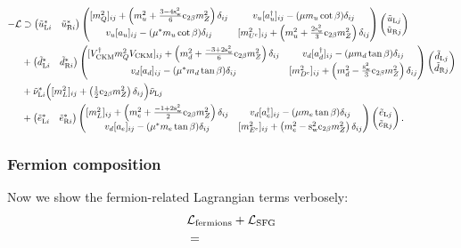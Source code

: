 \documentclass[CheatSheet]{subfiles}
\begin{document}
\begin{equation}
\begin{split}
  -\mathcal L&\supset
\pmat{\tuL[i]^*& \tuR[i]^*}
\pmat{
 [m_Q^2]_{ij}+\left(m_u^2+\frac{3-4\sw^2}{6}\co{2\beta}m_Z^2\right)\delta_{ij} &
v_u[a_u^\dagger]_{ij}-(\mu m_u\cot\beta)\delta_{ij}\\
v_u[a_u]_{ij}-(\mu^*m_u\cot\beta)\delta_{ij} &
 [m_{U^\cc}^2]_{ij}+\left(m_u^2+\frac{2\sw^2}{3}\co{2\beta}m_Z^2\right)\delta_{ij}
}
\pmat{\tuL[j]\\\tuR[j]}
\\&+
\pmat{\tdL[i]^*& \tdR[i]^*}
\pmat{
 [V\w{CKM}^\dagger m_Q^2V\w{CKM}]_{ij}+\left(m_d^2+\frac{-3+2\sw^2}{6}\co{2\beta}m_Z^2\right)\delta_{ij} &
v_d[a_d^\dagger]_{ij}-(\mu m_d\tan\beta)\delta_{ij}\\
v_d[a_d]_{ij}-(\mu^*m_d\tan\beta)\delta_{ij} &
 [m_{D^\cc}^2]_{ij}+\left(m_d^2-\frac{\sw^2}{3}\co{2\beta}m_Z^2\right)\delta_{ij}
}
\pmat{\tdL[j]\\\tdR[j]}
\\&+
\tnuL[i]^*\Bigl([m_L^2]_{ij}+\left(\tfrac12\co{2\beta}m_Z^2\right)\delta_{ij}\Bigr)\tnuL[j]
\\&+
\pmat{\teL[i]^*& \teR[i]^*}
\pmat{
 [m_L^2]_{ij}+\left(m_e^2+\frac{-1+2\sw^2}{2}\co{2\beta}m_Z^2\right)\delta_{ij} &
v_d[a_e^\dagger]_{ij}-(\mu m_e\tan\beta)\delta_{ij}\\
v_d[a_e]_{ij}-(\mu^*m_e\tan\beta)\delta_{ij} &
 [m_{E^\cc}^2]_{ij}+\left(m_e^2-\sw^2\co{2\beta}m_Z^2\right)\delta_{ij}
}
\pmat{\teL[j]\\\teR[j]}.
\end{split}
\end{equation}

\subsubsection{Fermion composition}
Now we show the fermion-related Lagrangian terms verbosely:
\begin{equation}
  \begin{split}
&  \mathcal L\w{fermions} + \mathcal L\w{SFG}
\\&=
\end{split}
\end{equation}
\end{document}
